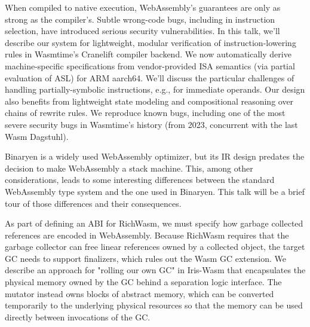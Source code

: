 \documentclass[a4paper,UKenglish]{dagrep-v2018}
\begin{document}
When compiled to native execution, WebAssembly’s guarantees are only as strong as the compiler’s. Subtle wrong-code bugs, including in instruction selection, have introduced serious security vulnerabilities. In this talk, we’ll describe our system for lightweight, modular verification of instruction-lowering rules in Wasmtime’s Cranelift compiler backend. We now automatically derive machine-specific specifications from vendor-provided ISA semantics (via partial evaluation of ASL) for ARM aarch64. We’ll discuss the particular challenges of handling partially-symbolic instructions, e.g., for immediate operands. Our design also benefits from lightweight state modeling and compositional reasoning over chains of rewrite rules. We reproduce known bugs, including one of the most severe security bugs in Wasmtime’s history (from 2023, concurrent with the last Wasm Dagstuhl).

\license
{}

Binaryen is a widely used WebAssembly optimizer, but its IR design predates the decision to make WebAssembly a stack machine. This, among other considerations, leads to some interesting differences between the standard WebAssembly type system and the one used in Binaryen. This talk will be a brief tour of those differences and their consequences.

\license
{}

As part of defining an ABI for RichWasm, we must specify how garbage collected references are encoded in WebAssembly. Because RichWasm requires that the garbage collector can free linear references owned by a collected object, the target GC needs to support finalizers, which rules out the Wasm GC extension. We describe an approach for "rolling our own GC" in Iris-Wasm that encapsulates the physical memory owned by the GC behind a separation logic interface. The mutator instead owns blocks of abstract memory, which can be converted temporarily to the underlying physical resources so that the memory can be used directly between invocations of the GC.
\end{document}
